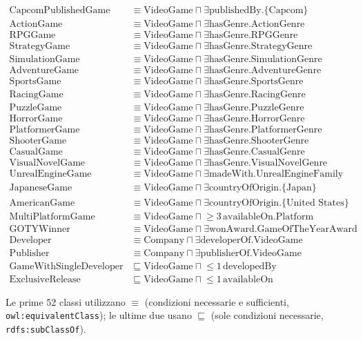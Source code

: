 \begin{align*}
\text{CapcomPublishedGame} &\equiv \text{VideoGame} \sqcap \exists\text{publishedBy.}\{\text{Capcom}\} \\
\text{ActionGame} &\equiv \text{VideoGame} \sqcap \exists\text{hasGenre.ActionGenre} \\
\text{RPGGame} &\equiv \text{VideoGame} \sqcap \exists\text{hasGenre.RPGGenre} \\
\text{StrategyGame} &\equiv \text{VideoGame} \sqcap \exists\text{hasGenre.StrategyGenre} \\
\text{SimulationGame} &\equiv \text{VideoGame} \sqcap \exists\text{hasGenre.SimulationGenre} \\
\text{AdventureGame} &\equiv \text{VideoGame} \sqcap \exists\text{hasGenre.AdventureGenre} \\
\text{SportsGame} &\equiv \text{VideoGame} \sqcap \exists\text{hasGenre.SportsGenre} \\
\text{RacingGame} &\equiv \text{VideoGame} \sqcap \exists\text{hasGenre.RacingGenre} \\
\text{PuzzleGame} &\equiv \text{VideoGame} \sqcap \exists\text{hasGenre.PuzzleGenre} \\
\text{HorrorGame} &\equiv \text{VideoGame} \sqcap \exists\text{hasGenre.HorrorGenre} \\
\text{PlatformerGame} &\equiv \text{VideoGame} \sqcap \exists\text{hasGenre.PlatformerGenre} \\
\text{ShooterGame} &\equiv \text{VideoGame} \sqcap \exists\text{hasGenre.ShooterGenre} \\
\text{CasualGame} &\equiv \text{VideoGame} \sqcap \exists\text{hasGenre.CasualGenre} \\
\text{VisualNovelGame} &\equiv \text{VideoGame} \sqcap \exists\text{hasGenre.VisualNovelGenre} \\
\text{UnrealEngineGame} &\equiv \text{VideoGame} \sqcap \exists\text{madeWith.UnrealEngineFamily} \\
\text{JapaneseGame} &\equiv \text{VideoGame} \sqcap \exists\text{countryOfOrigin.}\{\text{Japan}\} \\
\text{AmericanGame} &\equiv \text{VideoGame} \sqcap \exists\text{countryOfOrigin.}\{\text{United States}\} \\
\text{MultiPlatformGame} &\equiv \text{VideoGame} \sqcap \mathopen{\geq}3\,\text{availableOn.Platform} \\
\text{GOTYWinner} &\equiv \text{VideoGame} \sqcap \exists\text{wonAward.GameOfTheYearAward} \\[4pt]
\text{Developer}           &\equiv \text{Company} \sqcap \exists\text{developerOf.VideoGame} \\
\text{Publisher}           &\equiv \text{Company} \sqcap \exists\text{publisherOf.VideoGame} \\
\text{GameWithSingleDeveloper} &\sqsubseteq \text{VideoGame} \sqcap \mathopen{\leq}1\,\text{developedBy} \\
\text{ExclusiveRelease}     &\sqsubseteq \text{VideoGame} \sqcap \mathopen{\leq}1\,\text{availableOn}
\end{align*}
\endgroup

\vspace{8pt}
\noindent
Le prime 52 classi utilizzano $\equiv$ (condizioni necessarie e sufficienti,
\texttt{owl:equivalentClass}); le ultime due usano $\sqsubseteq$ (sole condizioni
necessarie, \texttt{rdfs:subClassOf}).
